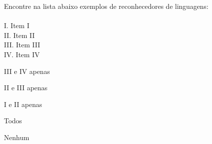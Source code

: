 \question[10]
Encontre na lista abaixo exemplos de reconhecedores de linguagens:\\
\\
I. Item I\\
II. Item II\\
III. Item III\\
IV. Item IV
\\
\begin{choices}
\item III e IV apenas
\item II e III apenas
\item I e II apenas
\item Todos
\item Nenhum %
\end{choices}
\answerline

